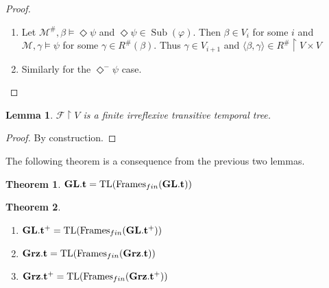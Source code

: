 \documentclass[a4paper]{article}
\theoremstyle{defin}
\theoremstyle{theorem}
\newtheorem{theorem}{Theorem}
\theoremstyle{prop}
\theoremstyle{lemma}
\newtheorem{lemma}{Lemma}
\theoremstyle{ex}
\theoremstyle{col}
\newcommand{\DiamondM}{\Diamond^{-}}
\begin{document}
\begin{proof}
  $ $

  \begin{enumerate}
    \item Let $\mathcal{M}^{\#}, \beta \models \Diamond \psi$ and $\Diamond \psi \in \operatorname{Sub}(\varphi)$. Then $\beta \in V_i$ for some $i$
    and $\mathcal{M}, \gamma \models \psi$ for some $\gamma \in R^{\#}(\beta)$. Thus $\gamma \in V_{i + 1}$ and $\langle \beta, \gamma \rangle \in R^{\#} \upharpoonright V \times V$
    \item Similarly for the $\DiamondM \psi$ case.
  \end{enumerate}
\end{proof}

\begin{lemma}
  $\mathcal{F} \upharpoonright V$ is a finite irreflexive transitive temporal tree.
\end{lemma}

\begin{proof}
  By construction.
\end{proof}

The following theorem is a consequence from the previous two lemmas.

\begin{theorem}
  ${\bf GL}.{\bf t} = \operatorname{TL}(\operatorname{Frames}_{fin}({\bf GL}.{\bf t}))$
\end{theorem}

\begin{theorem}
  $ $

  \begin{enumerate}
  \item ${\bf GL}.{\bf t}^{+} = \operatorname{TL}(\operatorname{Frames}_{fin}({\bf GL}.{\bf t}^{+}))$
  \item ${\bf Grz}.{\bf t} = \operatorname{TL}(\operatorname{Frames}_{fin}({\bf Grz}.{\bf t}))$
  \item ${\bf Grz}.{\bf t}^{+} = \operatorname{TL}(\operatorname{Frames}_{fin}({\bf Grz}.{\bf t}^{+}))$
  \end{enumerate}
\end{theorem}
\end{document}
